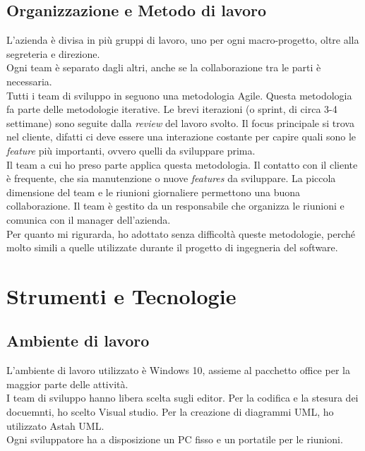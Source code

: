 \subsection{Organizzazione e Metodo di lavoro}
L'azienda è divisa in più gruppi di lavoro, uno per ogni macro-progetto, oltre alla segreteria e direzione.\\
Ogni team è separato dagli altri, anche se la collaborazione tra le parti è necessaria.\\
Tutti i team di sviluppo in \company seguono una metodologia Agile. Questa metodologia fa parte delle metodologie iterative. Le brevi iterazioni (o sprint, di circa 3-4 settimane) sono seguite dalla \textit{review} del lavoro svolto. Il focus principale si trova nel cliente, difatti ci deve essere una interazione costante per capire quali sono le \textit{feature} più importanti, ovvero quelli da sviluppare prima.\\
Il team a cui ho preso parte applica questa metodologia. Il contatto con il cliente è frequente, che sia manutenzione o nuove \textit{features} da sviluppare. La piccola dimensione del team e le riunioni giornaliere permettono una buona collaborazione. Il team è gestito da un responsabile che organizza le riunioni e comunica con il manager dell'azienda.\\
Per quanto mi rigurarda, ho adottato senza difficoltà queste metodologie, perché molto simili a quelle utilizzate durante il progetto di ingegneria del software.

\section{Strumenti e Tecnologie}

\subsection{Ambiente di lavoro}
L'ambiente di lavoro utilizzato è Windows 10, assieme al pacchetto office per la maggior parte delle attività.\\
I team di sviluppo hanno libera scelta sugli editor. Per la codifica e la stesura dei docuemnti, ho scelto Visual studio. Per la creazione di diagrammi UML, ho utilizzato Astah UML.\\
Ogni sviluppatore ha a disposizione un PC fisso e un portatile per le riunioni.


